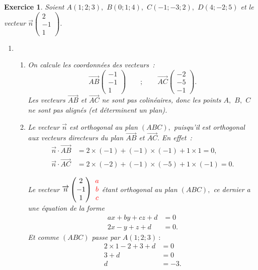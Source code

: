 \documentclass[10pt]{article}
\newtheorem{exo}{Exercice}
\begin{document}
\begin{exo}

Soient $A(1;2;3),$ $B(0;1;4),$ $C(-1;-3;2),$ $D(4;-2;5)$ et le vecteur $\overrightarrow{n}\begin{pmatrix}2\\-1\\1\end{pmatrix}.$

\begin{enumerate}
\item 
\begin{enumerate}
\item On calcule les coordonnées des vecteurs~:
\[\overrightarrow{AB}\begin{pmatrix} -1\\-1\\1\end{pmatrix}\qquad;\qquad \overrightarrow{AC}\begin{pmatrix} -2\\-5\\-1\end{pmatrix}.\] Les vecteurs $\overrightarrow{AB}$ et $\overrightarrow{AC}$ ne sont pas colinéaires, donc les points $A,$ $B,$ $C$ ne sont pas alignés (et déterminent un plan).

\item Le vecteur $\overrightarrow{n}$ est orthogonal au plan $(ABC),$ puisqu'il est orthogonal aux vecteurs  directeurs du plan $\overrightarrow{AB}$ et $\overrightarrow{AC}.$ En effet~:
\begin{align*}
\overrightarrow{n}\cdot\overrightarrow{AB}&=2\times (-1)+(-1)\times (-1)+1\times 1=0,\\
\overrightarrow{n}\cdot\overrightarrow{AC}&=2\times (-2)+(-1)\times (-5)+1\times (-1)=0.
\end{align*}

Le vecteur $\overrightarrow{n}\begin{pmatrix}2\\-1\\1\end{pmatrix}~\textcolor{red}{\begin{matrix}a\\b\\c\end{matrix}}$ étant orthogonal au plan $(ABC),$ ce dernier a une équation de la forme
\begin{align*}ax+by+cz+d&=0\\2x-y+z+d&=0.\end{align*}
Et comme $(ABC)$ passe par $A(1;2;3)~:$
\begin{align*}
2\times 1-2+3+d&=0\\
3+d&=0\\
d&=-3.\end{align*}


\end{enumerate}
\end{enumerate}
\end{exo}
\end{document}
